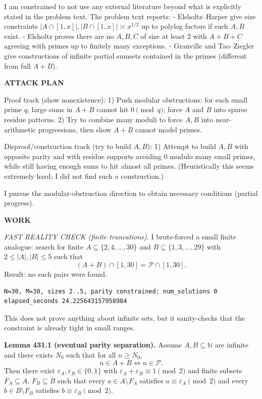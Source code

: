 I am constrained to not use any external literature beyond what is explicitly stated in the problem text. The problem text reports:
- Elsholtz--Harper give size constraints $\lvert A\cap[1,x]\rvert,\lvert B\cap[1,x]\rvert\asymp x^{1/2}$ up to polylog factors if such $A,B$ exist.
- Elsholtz proves there are no $A,B,C$ of size at least $2$ with $A+B+C$ agreeing with primes up to finitely many exceptions.
- Granville and Tao--Ziegler give constructions of infinite partial sumsets contained in the primes (different from full $A+B$).

\medskip
\noindent\textbf{ATTACK PLAN}

Proof track (show nonexistence):
1) Push modular obstructions: for each small prime $q$, large sums in $A+B$ cannot hit $0\pmod q$; force $A$ and $B$ into sparse residue patterns.
2) Try to combine many moduli to force $A,B$ into near-arithmetic progressions, then show $A+B$ cannot model primes.

Disproof/construction track (try to build $A,B$):
1) Attempt to build $A,B$ with opposite parity and with residue supports avoiding $0$ modulo many small primes, while still having enough sums to hit almost all primes.
(Heuristically this seems extremely hard; I did not find such a construction.)

I pursue the modular-obstruction direction to obtain necessary conditions (partial progress).

\medskip
\noindent\textbf{WORK}

\noindent\emph{FAST REALITY CHECK (finite truncations).}
I brute-forced a small finite analogue: search for finite $A\subseteq\{2,4,\dots,30\}$ and $B\subseteq\{1,3,\dots,29\}$ with $2\le |A|,|B|\le 5$ such that
\[(A+B)\cap[1,30] = \mathcal P\cap[1,30].\]
Result: no such pairs were found.
\begin{verbatim}
N=30, M=30, sizes 2..5, parity constrained: num_solutions 0
elapsed_seconds 24.225643157958984
\end{verbatim}
This does not prove anything about infinite sets, but it sanity-checks that the constraint is already tight in small ranges.

\medskip
\noindent\textbf{Lemma 431.1 (eventual parity separation).}
Assume $A,B\subseteq\mathbb N$ are infinite and there exists $N_0$ such that for all $n\ge N_0$,
\[n\in A+B \iff n\in\mathcal P.\]
Then there exist $\varepsilon_A,\varepsilon_B\in\{0,1\}$ with $\varepsilon_A+\varepsilon_B\equiv 1\pmod 2$ and finite subsets $F_A\subseteq A$, $F_B\subseteq B$ such that every $a\in A\setminus F_A$ satisfies $a\equiv \varepsilon_A\pmod 2$ and every $b\in B\setminus F_B$ satisfies $b\equiv \varepsilon_B\pmod 2$.

